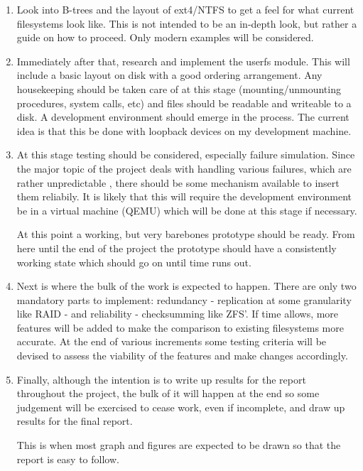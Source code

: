     \begin{enumerate}

        \item Look into B-trees and the layout of ext4/NTFS to get a feel for
            what current filesystems look like. This is not intended to be an
            in-depth look, but rather a guide on how to proceed. Only modern
            examples will be considered.

        \item Immediately after that, research and implement the userfs module.
            This will include a basic layout on disk with a good ordering
            arrangement. Any housekeeping should be taken care of at this stage
            (mounting/unmounting procedures, system calls, etc) and files
            should be readable and writeable to a disk. A development
            environment should emerge in the process. The current idea is that
            this be done with loopback devices on my development machine.

        \item At this stage testing should be considered, especially failure
            simulation. Since the major topic of the project deals with
            handling various failures, which are rather unpredictable
            \cite{google_flash}, there should be some mechanism available to
            insert them reliabily. It is likely that this will require the
            development environment be in a virtual machine (QEMU) which will
            be done at this stage if necessary.

            At this point a working, but very barebones prototype should be
            ready. From here until the end of the project the prototype should
            have a consistently working state which should go on until time
            runs out.

        \item Next is where the bulk of the work is expected to happen. There
            are only two mandatory parts to implement: redundancy - replication
            at some granularity like RAID - and reliability - checksumming like
            ZFS'. If time allows, more features will be added to make the
            comparison to existing filesystems more accurate. At the end of
            various increments some testing criteria will be devised to assess
            the viability of the features and make changes accordingly.

        \item Finally, although the intention is to write up results for the
            report throughout the project, the bulk of it will happen at the
            end so some judgement will be exercised to cease work, even if
            incomplete, and draw up results for the final report.

            This is when most graph and figures are expected to be drawn so
            that the report is easy to follow.

    \label{l1_num}
    \end{enumerate}


